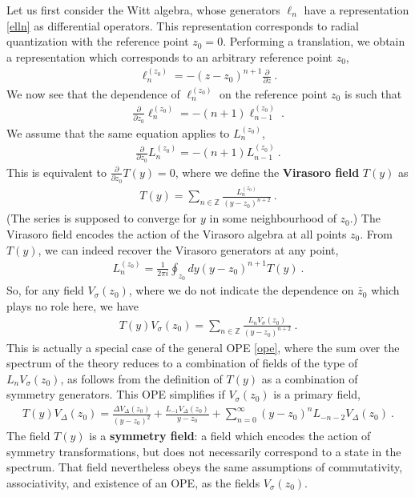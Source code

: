 \documentclass[12pt, a4paper, notitlepage, twoside]{report}
\numberwithin{equation}{section}
\theoremstyle{break}
\begin{document}
Let us first consider the Witt algebra, whose generators $\ell_n$
have a representation \eqref{elln} as differential operators.
This representation corresponds to radial quantization with the reference point $z_0=0$.
Performing a translation, we obtain
a representation which corresponds to an arbitrary reference point $z_0$, 
\begin{align}
 \ell_n^{(z_0)} = -(z-z_0)^{n+1}{\frac{\partial}{\partial z}}\ .
\label{lzz}
\end{align}
We now see that the dependence of $\ell_n^{(z_0)}$ on the reference point $z_0$ is such that
\begin{align}
 {\frac{\partial}{\partial z_0}} \ell_{n}^{(z_0)} = -(n+1) \ell_{n-1}^{(z_0)}\ .
\end{align}
We assume that the same equation applies to $L_n^{(z_0)}$, 
\begin{align}
 {\frac{\partial}{\partial z_0}} L_{n}^{(z_0)} = -(n+1) L_{n-1}^{(z_0)}\ .
\label{pll}
\end{align}
This is equivalent to $\frac{\partial}{\partial z_0} T(y) = 0$, where we define the \textbf{\boldmath Virasoro field} $T(y)$ as 
\begin{align}
 \boxed{T(y) = \sum_{n\in{\mathbb{Z}}} \frac{L_n^{(z_0)}}{(y-z_0)^{n+2}}}\ .
\label{tsl}
\end{align}
(The series is supposed to converge for $y$ in some neighbourhood of $z_0$.)
The Virasoro field encodes the action of the Virasoro algebra at all points $z_0$. 
From $T(y)$, we can indeed recover the Virasoro generators at any point,
\begin{align}
\boxed{ L_n^{(z_0)} = \frac{1}{2\pi i}\oint_{z_0} dy (y-z_0)^{n+1} T(y)} \ .
\label{lit}
\end{align}
So, for any field $V_\sigma(z_0)$, where we do not indicate the dependence on $\bar{z}_0$ which plays no role here, we have
\begin{align}
 \boxed{T(y)V_\sigma(z_0) = \sum_{n\in{\mathbb{Z}}} \frac{L_n V_\sigma(z_0)}{(y-z_0)^{n+2}}}\ .
\label{tv}
\end{align}
This is actually a special case of the general OPE \eqref{ope}, where the sum over the spectrum of the theory reduces to a combination of fields of the type of $L_n V_\sigma(z_0)$, as follows from the definition of $T(y)$ as a combination of symmetry generators.
This OPE simplifies if $V_\sigma(z_0)$ is a primary field, 
\begin{align}
 T(y) V_\Delta(z_0) = \frac{\Delta V_\Delta(z_0)}{(y-z_0)^2} + \frac{L_{-1} V_\Delta(z_0)}{y-z_0} + \sum_{n=0}^\infty (y-z_0)^n L_{-n-2}V_\Delta(z_0)\ .
\label{tvp}
\end{align}
The field $T(y)$ is a \textbf{\boldmath symmetry field}: a field which encodes the action of symmetry transformations, but does not necessarily correspond to a state in the spectrum. 
That field nevertheless obeys the same assumptions of commutativity, associativity, and existence of an OPE, as the fields $V_\sigma(z_0)$.
\end{document}
